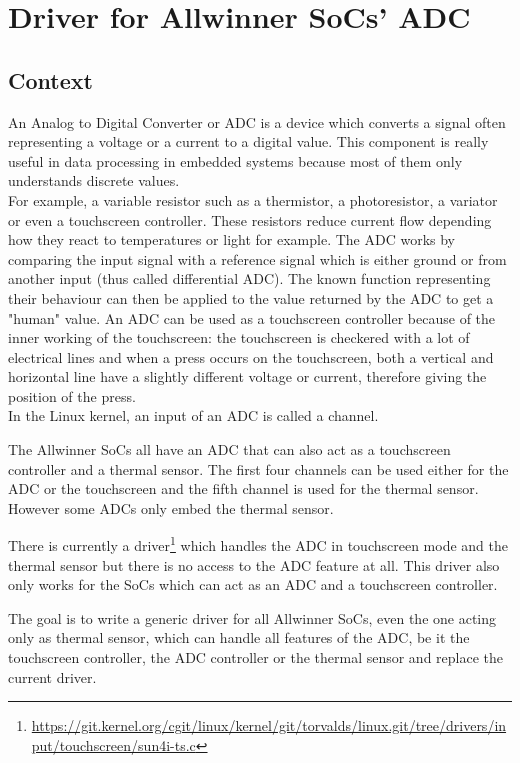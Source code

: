\chapter{Driver for Allwinner SoCs' ADC}
\section{Context}

An Analog to Digital Converter or ADC is a device which converts a signal often representing a voltage or a current to a digital value. This component is really useful in data processing in embedded systems because most of them only understands discrete values.\\
For example, a variable resistor such as a thermistor, a photoresistor, a variator or even a touchscreen controller. These resistors reduce current flow depending how they react to temperatures or light for example. The ADC works by comparing the input signal with a reference signal which is either ground or from another input (thus called differential ADC). The known function representing their behaviour can then be applied to the value returned by the ADC to get a "human" value. An ADC can be used as a touchscreen controller because of the inner working of the touchscreen: the touchscreen is checkered with a lot of electrical lines and when a press occurs on the touchscreen, both a vertical and horizontal line have a slightly different voltage or current, therefore giving the position of the press.\\
In the Linux kernel, an input of an ADC is called a channel.

The Allwinner SoCs all have an ADC that can also act as a touchscreen controller and a thermal sensor. The first four channels can be used either for the ADC or the touchscreen and the fifth channel is used for the thermal sensor. However some ADCs only embed the thermal sensor.

There is currently a driver\footnote{\url{https://git.kernel.org/cgit/linux/kernel/git/torvalds/linux.git/tree/drivers/input/touchscreen/sun4i-ts.c}} which handles the ADC in touchscreen mode and the thermal sensor but there is no access to the ADC feature at all. This driver also only works for the SoCs which can act as an ADC and a touchscreen controller.

The goal is to write a generic driver for all Allwinner SoCs, even the one acting only as thermal sensor, which can handle all features of the ADC, be it the touchscreen controller, the ADC controller or the thermal sensor and replace the current driver.

